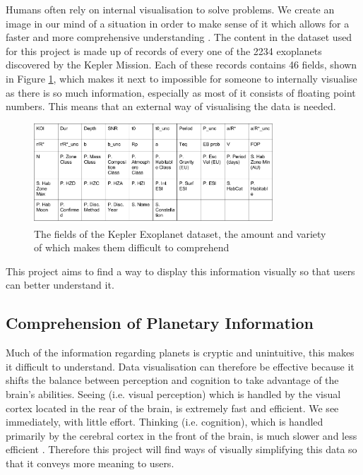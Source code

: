 Humans often rely on internal visualisation to solve problems. We create an
image in our mind of a situation in order to make sense of it
 which allows for a faster and more comprehensive
understanding \cite{visualisingpiggott}. The content in the dataset used
for this project is made up of records of every one of the 2234 exoplanets
discovered by the Kepler Mission. Each of these records contains 46 fields,
shown
in Figure \ref{fig:fields}, which
makes it next to impossible for someone to internally visualise as there is so
much information, especially as most of it consists of floating point numbers.
This means that an external
way of visualising the data is needed.
\begin{figure}[H]
  \centering
      \includegraphics[width=0.8\textwidth]{images/data.png}
  \caption[Kepler Exoplanet dataset fields]{The fields of the Kepler Exoplanet
dataset, the amount and variety of which makes them difficult to comprehend}
  \label{fig:fields}
\end{figure}
 This project aims to find a way to display this information visually
so that users can better understand it.
\subsection{Comprehension of Planetary Information}
Much of the information regarding planets is cryptic and unintuitive, this makes
it difficult to understand. Data visualisation can therefore be effective
because it shifts the balance between perception and cognition to take advantage
of
the brain's abilities. Seeing (i.e. visual perception) which is handled by the
visual cortex located in the rear of the brain, is extremely fast and efficient.
We see immediately, with little effort. Thinking (i.e. cognition), which is
handled primarily by the cerebral cortex in the front of the brain, is much
slower and less efficient \cite{few}. Therefore this project will find ways of
visually simplifying this data so that it conveys more meaning to users. 


